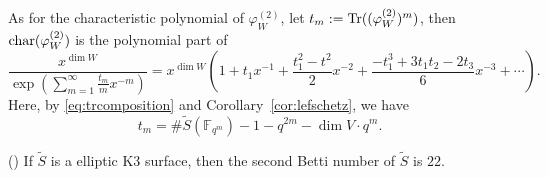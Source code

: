 \documentclass[main]{subfiles}
\begin{document}
As for the characteristic polynomial of $\varphi^{(2)}_{W}$, let $t_{m} := \operatorname{Tr}((\varphi^{(2)}_{W})^{m})$, then $\operatorname{char} (\varphi^{(2)}_{W})$ is the polynomial part of
\begin{equation*}
    \frac{x^{\dim W}}{\exp \left( \sum_{m = 1}^{\infty} \frac{t_{m}}{m} x^{-m} \right)} = x^{\dim W} \left( 1 + t_{1} x^{-1} + \frac{t_{1}^{2} - t^{2}}{2} x^{-2} + \frac{-t_{1}^{3} + 3 t_{1} t_{2} - 2 t_{3}}{6} x^{-3} + \cdots \right).
\end{equation*}
Here, by \eqref{eq:trcomposition} and Corollary~\ref{cor:lefschetz}, we have
\begin{equation*}
    t_{m} = \# \tilde{S}(\mathbb{F}_{q^{m}}) - 1 - q^{2m} - \dim V \cdot q^{m}.
\end{equation*}

\begin{lem}{(\cite[Theorem 4, Part III]{ref:mumford2004})}
    \label{lem:k3-betti}
    If $\tilde{S}$ is a elliptic K3 surface, then the second Betti number of $\tilde{S}$ is $22$.
\end{lem}
\end{document}
